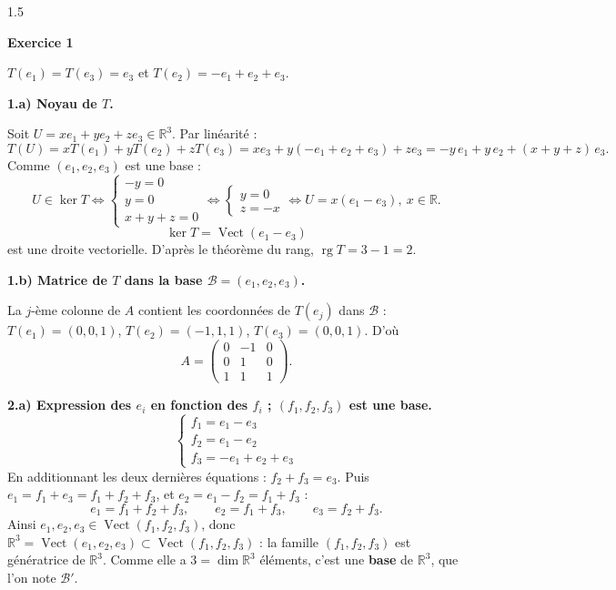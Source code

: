 \documentclass[12pt]{article}
\begin{document}
\begin{spacing}{1.5}

\textbf{Exercice 1}

$T(e_1)=T(e_3)=e_3$ et $T(e_2)=-e_1+e_2+e_3$.

\textbf{1.a) Noyau de $T$.}

Soit $U=xe_1+ye_2+ze_3\in\mathbb{R}^3$. Par linéarité :
\[
T(U)=xT(e_1)+yT(e_2)+zT(e_3)=xe_3+y(-e_1+e_2+e_3)+ze_3=-y\,e_1+y\,e_2+(x+y+z)\,e_3 .
\]
Comme $(e_1,e_2,e_3)$ est une base :
\[
U\in\ker T\iff\begin{cases}-y=0\\y=0\\x+y+z=0\end{cases}\iff\begin{cases}y=0\\z=-x\end{cases}\iff U=x(e_1-e_3),\ x\in\mathbb{R}.
\]
\[
\boxed{\ker T=\operatorname{Vect}(e_1-e_3)}
\]
est une droite vectorielle. D'après le théorème du rang, $\operatorname{rg}T=3-1=2$.

\textbf{1.b) Matrice de $T$ dans la base $\mathcal{B}=(e_1,e_2,e_3)$.}

La $j$-ème colonne de $A$ contient les coordonnées de $T(e_j)$ dans $\mathcal{B}$ : $T(e_1)=(0,0,1)$, $T(e_2)=(-1,1,1)$, $T(e_3)=(0,0,1)$. D'où
\[
A=\begin{pmatrix}
0 & -1 & 0 \\
0 & 1 & 0 \\
1 & 1 & 1
\end{pmatrix}.
\]

\textbf{2.a) Expression des $e_i$ en fonction des $f_i$ ; $(f_1,f_2,f_3)$ est une base.}
\[
\begin{cases}
f_1=e_1-e_3\\
f_2=e_1-e_2\\
f_3=-e_1+e_2+e_3
\end{cases}
\]
En additionnant les deux dernières équations : $f_2+f_3=e_3$. Puis $e_1=f_1+e_3=f_1+f_2+f_3$, et $e_2=e_1-f_2=f_1+f_3$ :
\[
\boxed{e_1=f_1+f_2+f_3,\qquad e_2=f_1+f_3,\qquad e_3=f_2+f_3}.
\]
Ainsi $e_1,e_2,e_3\in\operatorname{Vect}(f_1,f_2,f_3)$, donc $\mathbb{R}^3=\operatorname{Vect}(e_1,e_2,e_3)\subset\operatorname{Vect}(f_1,f_2,f_3)$ : la famille $(f_1,f_2,f_3)$ est génératrice de $\mathbb{R}^3$. Comme elle a $3=\dim\mathbb{R}^3$ éléments, c'est une \textbf{base} de $\mathbb{R}^3$, que l'on note $\mathcal{B}'$.


\end{spacing}
\end{document}

